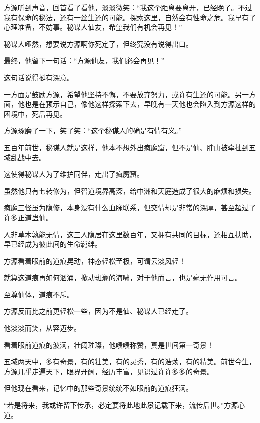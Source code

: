 \begin{this_body}
方源听到声音，回首看了看他，淡淡微笑：“我这个距离要离开，已经晚了。不过我有保命的秘法，还有一丝生还的可能。探索这里，自然会有性命之危。我早有了心理准备，不妨事。秘谋人仙友，希望我们有机会再见！”

秘谋人哑然，想要说方源啊你死定了，但终究没有说得出口。

最终，他留下一句话：“方源仙友，我们必会再见！”

这句话说得挺有深意。

一方面是鼓励方源，希望他坚持不懈，不要放弃努力，或许有生还的可能。另一方面，他也是在预示自己，像他这样探索下去，早晚有一天他也会陷入到方源这样的困境中，死后再见。

方源琢磨了一下，笑了笑：“这个秘谋人的确是有情有义。”

五百年前世，秘谋人就是这样，他本不想外出疯魔窟，但不是仙、胖山被牵扯到五域乱战中去。

这使得秘谋人为了维护同伴，走出了疯魔窟。

虽然他只有七转修为，但智道境界高深，给中洲和天庭造成了很大的麻烦和损失。

疯魔三怪虽为隐修，本身没有什么血脉联系，但交情却是非常的深厚，甚至超过了许多正道蛊仙。

人非草木孰能无情，这三人隐居在这里数百年，又拥有共同的目标，还相互扶助，早已经成为彼此间的生命羁绊。

方源看着眼前的道痕晃动，神态轻松至极，可谓云淡风轻！

就算这道痕再如何汹涌，掀动斑斓的海啸，对于他而言，也是毫无作用可言。

至尊仙体，道痕不斥。

方源反而比之前更轻松一些，因为不是仙、秘谋人已经走了。

他淡淡而笑，从容迈步。

看着眼前道痕的波澜，壮阔璀璨，他啧啧称赞，真是世间第一奇景！

五域两天中，多有奇景，有的壮美，有的灵秀，有的浩荡，有的精美。前世今生，方源几乎走遍天下，眼界开阔，经历丰富，见识过许许多多的奇景。

但他现在看来，记忆中的那些奇景统统不如眼前的道痕狂澜。

“若是将来，我或许留下传承，必定要将此地此景记载下来，流传后世。”方源心道。

\end{this_body}

